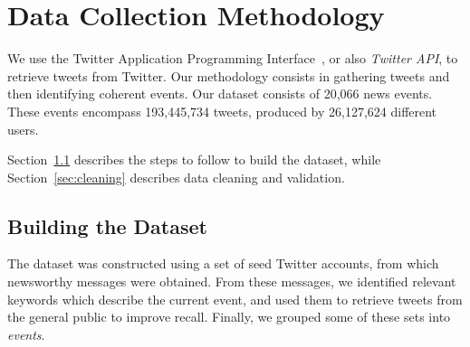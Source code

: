 \chapter{Data Collection Methodology}
\label{chapter:data}  


We use the Twitter Application Programming Interface~\cite{twitterapi}, or also
{\em Twitter API}, to retrieve tweets from Twitter. 
%
Our methodology consists in gathering tweets and then identifying coherent
events. 
%
Our dataset consists of 20,066 news events. These events encompass 193,445,734
tweets, produced by 26,127,624 different users.


Section~\ref{sec:dataset} describes the steps to follow to build the dataset,
while Section~\ref{sec:cleaning} describes data cleaning and validation.


\section{Building the Dataset}\label{sec:dataset}

The dataset was constructed using a set of seed Twitter accounts, from which
newsworthy messages were obtained.
%
From these messages, we identified relevant keywords which describe the current
event, and used them to retrieve tweets from the general public to improve
recall.
%
Finally, we grouped some of these sets into {\em events}.





